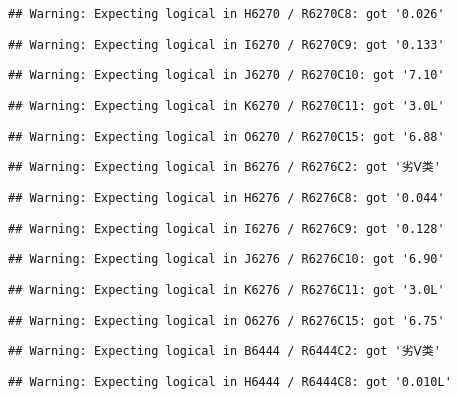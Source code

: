 \documentclass[
]{article}
\begin{document}
\begin{verbatim}
## Warning: Expecting logical in H6270 / R6270C8: got '0.026'
\end{verbatim}

\begin{verbatim}
## Warning: Expecting logical in I6270 / R6270C9: got '0.133'
\end{verbatim}

\begin{verbatim}
## Warning: Expecting logical in J6270 / R6270C10: got '7.10'
\end{verbatim}

\begin{verbatim}
## Warning: Expecting logical in K6270 / R6270C11: got '3.0L'
\end{verbatim}

\begin{verbatim}
## Warning: Expecting logical in O6270 / R6270C15: got '6.88'
\end{verbatim}

\begin{verbatim}
## Warning: Expecting logical in B6276 / R6276C2: got '劣Ⅴ类'
\end{verbatim}

\begin{verbatim}
## Warning: Expecting logical in H6276 / R6276C8: got '0.044'
\end{verbatim}

\begin{verbatim}
## Warning: Expecting logical in I6276 / R6276C9: got '0.128'
\end{verbatim}

\begin{verbatim}
## Warning: Expecting logical in J6276 / R6276C10: got '6.90'
\end{verbatim}

\begin{verbatim}
## Warning: Expecting logical in K6276 / R6276C11: got '3.0L'
\end{verbatim}

\begin{verbatim}
## Warning: Expecting logical in O6276 / R6276C15: got '6.75'
\end{verbatim}

\begin{verbatim}
## Warning: Expecting logical in B6444 / R6444C2: got '劣Ⅴ类'
\end{verbatim}

\begin{verbatim}
## Warning: Expecting logical in H6444 / R6444C8: got '0.010L'
\end{verbatim}
\end{document}
